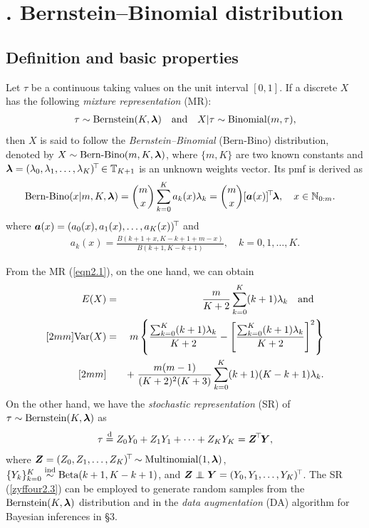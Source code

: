 
\section{$\!\!\!\!\!\!\!$. Bernstein--Binomial distribution}

\subsection{Definition and basic properties}   %

Let $\tau$ be a continuous \trv taking values on the unit interval $[0,1]$. If a discrete \trv $X$ has the following \textit{mixture representation} (MR):
\begin{eqnarray}   \label{eqn2.1}
   \tau \sim \mbox{Bernstein}(K, {\boldsymbol{\lambda}}) \quad \mbox{and} \quad X|\tau \sim \mbox{Binomial}(m,\tau),
\end{eqnarray}
then $X$ is said to follow the \textit{Bernstein--Binomial} (Bern-Bino) distribution, denoted by $X \sim \mbox{Bern-Bino}(m, K, {\boldsymbol{\lambda}})$, where $\{m, K\}$ are two known constants and ${\boldsymbol{\lambda}} = (\lambda_0, \lambda_1, \dots, \lambda_K)^{\!\top\!} \in {\mathbb{T}}_{K+1}$ is an unknown weights vector. Its pmf is derived as
\begin{eqnarray}  \label{eqn2.2}
   \mbox{Bern-Bino}(x|m, K, {\boldsymbol{\lambda}}) = \binom{m}{x} \sum_{k=0}^K  a_k(x) \lambda_k = \binom{m}{x} [{\boldsymbol{a}}(x)]^{\!\top\!} {\boldsymbol{\lambda}}, \quad x \in {\mathbb{N}}_{0:m}. \quad
\end{eqnarray}
where ${\boldsymbol{a}}(x) =(a_0(x), a_1(x), \dots, a_K(x))^{\!\top\!}$ and
\begin{eqnarray*}
   a_k(x) = \frac{B(k+1+x, K-k+1+m-x)}{B(k+1,K-k+1)}, \quad k=0, 1, \dots, K.
\end{eqnarray*}

From the MR (\ref{eqn2.1}), on the one hand, we can obtain
\begin{eqnarray*}
   E(X) &=& \frac{m}{K+2} \sum_{k=0}^K (k+1)\lambda_k \quad \mbox{and} \quad   \\ [2mm]
   \mbox{Var}(X) &=& m \left\{ \frac{\sum_{k=0}^K (k+1)\lambda_k}{K+2} - \left[ \frac{\sum_{k=0}^K (k+1)\lambda_k}{K+2} \right]^2 \right\}  \\ [2mm]
   & & +\; \frac{m(m-1)}{(K+2)^2(K+3)} \sum_{k=0}^K (k+1)(K-k+1) \lambda_k.
\end{eqnarray*}
On the other hand, we have the \textit{stochastic representation} (SR) of $\tau \sim \mbox{Bernstein}(K, {\boldsymbol{\lambda}})$ as
\begin{eqnarray} \label{zyffour2.3}
   \tau \stackrel{{\rm d}}{=} Z_0 Y_0 + Z_1 Y_1 + \cdots + Z_K Y_K = {\boldsymbol{Z}}^{\!\top\!} {\boldsymbol{Y}},
\end{eqnarray}
where ${\boldsymbol{Z}} = (Z_0,Z_1,\ldots,Z_K)^{\!\top\!} \sim \mbox{Multinomial}(1,{\boldsymbol{\lambda}})$, $\{Y_k\}_{k=0}^K \stackrel{{\rm ind}}{\sim} \mbox{Beta}(k+1,K-k+1)$, and $\ibZ \inde \ibY = (Y_0, Y_1,\ldots, Y_K)^{\T}$. The SR (\ref{zyffour2.3}) can be employed to generate random samples from the $\mbox{Bernstein}(K, {\boldsymbol{\lambda}})$ distribution and in the \textit{data augmentation} (DA) algorithm for Bayesian inferences in \S 3.

